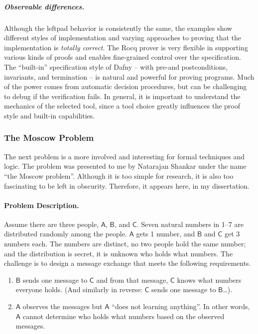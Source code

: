 \subparagraph*{Observable differences.}
Although the leftpad behavior is consistently the same,
the examples show different styles of implementation and varying approaches to proving that the implementation is \emph{totally correct}.
The Rocq prover is very flexible in supporting various kinds of proofs and enables fine-grained control over the specification.
The \enquote{built-in} specification style of Dafny -- with pre-and postconditions, invariants, and termination -- is natural and powerful for proving programs.
Much of the power comes from automatic decision procedures, but can be challenging to debug if the verification fails.
In general, it is important to understand the mechanics of the selected tool, since a tool choice greatly influences the proof style and built-in capabilities.

\subsubsection{The Moscow Problem}
\label{subsec:moscow}

The next problem is a more involved and interesting for formal techniques and logic.
The problem was presented to me by Natarajan Shankar under the name \enquote{the Moscow problem}.
Although it is too simple for research, it is also too fascinating to be left in obscurity.
Therefore, it appears here, in my dissertation.

\paragraph*{Problem Description.}
Assume there are three people, \(\mathsf{A}\), \(\mathsf{B}\), and \(\mathsf{C}\)\@.
Seven natural numbers in 1--7 are distributed randomly among the people.
\(\mathsf{A}\) gets 1 number, and \(\mathsf{B}\) and \(\mathsf{C}\) get 3 numbers each.
The numbers are distinct, \ie no two people hold the same number;
and the distribution is secret, \ie it is unknown who holds what numbers.
The challenge is to design a message exchange that meets the following requirements.

\begin{enumerate}
\item \(\mathsf{B}\) sends one message to \(\mathsf{C}\) and from that message, \(\mathsf{C}\) knows what numbers everyone holds.
      (And similarly in reverse: \(\mathsf{C}\) sends one message to \(\mathsf{B}\)\ldots).
\item \(\mathsf{A}\) observes the messages but \(\mathsf{A}\) \enquote{does not learning anything}.
      In other words, \(\mathsf{A}\) cannot determine who holds what numbers based on the observed messages.
\end{enumerate}

